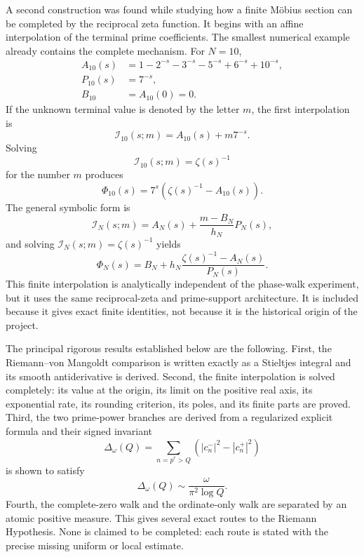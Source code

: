 \documentclass[11pt]{amsart}
\numberwithin{equation}{section}
\theoremstyle{plain}
\theoremstyle{definition}
\theoremstyle{remark}
\newcommand{\1}{\mathbf{1}}
\begin{document}
A second construction was found while studying how a finite Möbius section
can be completed by the reciprocal zeta function.  It begins with an affine
interpolation of the terminal prime coefficients.  The smallest numerical
example already contains the complete mechanism.  For \(N=10\),
\begin{align}
A_{10}(s)
&=
1-2^{-s}-3^{-s}-5^{-s}+6^{-s}+10^{-s},
\label{eq:intro_A10}
\\
P_{10}(s)
&=
7^{-s},
\label{eq:intro_P10}
\\
B_{10}
&=
A_{10}(0)=0.
\label{eq:intro_B10}
\end{align}
If the unknown terminal value is denoted by the letter \(m\), the first
interpolation is
\begin{equation}
\mathcal I_{10}(s;m)
=
A_{10}(s)+m7^{-s}.
\label{eq:intro_I10}
\end{equation}
Solving
\begin{equation}
\mathcal I_{10}(s;m)=\zeta(s)^{-1}
\label{eq:intro_I10_completion}
\end{equation}
for the number \(m\) produces
\begin{equation}
\Phi_{10}(s)
=
7^s\left(\zeta(s)^{-1}-A_{10}(s)\right).
\label{eq:intro_Phi10}
\end{equation}
The general symbolic form is
\begin{equation}
\mathcal I_N(s;m)
=
A_N(s)+\frac{m-B_N}{h_N}P_N(s),
\label{eq:intro_general_interpolation}
\end{equation}
and solving \(\mathcal I_N(s;m)=\zeta(s)^{-1}\) yields
\begin{equation}
\Phi_N(s)
=
B_N+h_N\frac{\zeta(s)^{-1}-A_N(s)}{P_N(s)}.
\label{eq:intro_general_Phi}
\end{equation}
This finite interpolation is analytically independent of the phase-walk
experiment, but it uses the same reciprocal-zeta and prime-support
architecture.  It is included because it gives exact finite identities,
not because it is the historical origin of the project.

The principal rigorous results established below are the following.
First, the Riemann--von Mangoldt comparison is written exactly as a
Stieltjes integral and its smooth antiderivative is derived.  Second, the
finite interpolation is solved completely: its value at the origin, its
limit on the positive real axis, its exponential rate, its rounding
criterion, its poles, and its finite parts are proved.  Third, the two
prime-power branches are derived from a regularized explicit formula and
their signed invariant
\begin{equation}
\Delta_\omega(Q)
=
\sum_{n=p^r>Q}
\left(|c_n^-|^2-|c_n^+|^2\right)
\label{eq:intro_Delta}
\end{equation}
is shown to satisfy
\begin{equation}
\Delta_\omega(Q)
\sim
\frac{\omega}{\pi^2\log Q}.
\label{eq:intro_Delta_asymptotic}
\end{equation}
Fourth, the complete-zero walk and the ordinate-only walk are separated by
an atomic positive measure.  This gives several exact routes to the Riemann
Hypothesis.  None is claimed to be completed: each route is stated with the
precise missing uniform or local estimate.
\end{document}
